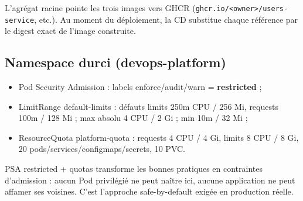 \documentclass[12pt,a4paper]{article}
\begin{document}
L'agrégat racine pointe les trois images vers GHCR (\texttt{ghcr.io/<owner>/users-service}, etc.). Au moment du déploiement, la CD substitue chaque référence par le digest exact de l'image construite.

\subsection{Namespace durci (devops-platform)}
\begin{itemize}[itemsep=1pt]
  \item Pod Security Admission : labels enforce/audit/warn = \textbf{restricted} ;
  \item LimitRange default-limits : défauts limits 250m CPU / 256 Mi, requests 100m / 128 Mi ; max absolu 4 CPU / 2 Gi ; min 10m / 32 Mi ;
  \item ResourceQuota platform-quota : requests 4 CPU / 4 Gi, limits 8 CPU / 8 Gi, 20 pods/services/configmaps/secrets, 10 PVC.
\end{itemize}

\begin{whybox}
PSA restricted + quotas transforme les bonnes pratiques en contraintes d'admission : aucun Pod privilégié ne peut naître ici, aucune application ne peut affamer ses voisines. C'est l'approche safe-by-default exigée en production réelle.
\end{whybox}
\end{document}
